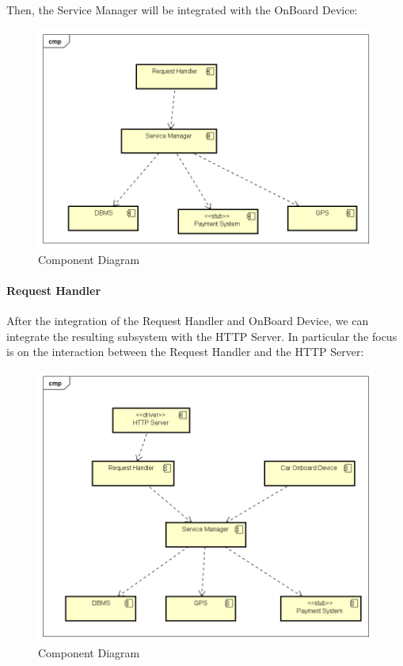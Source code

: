 Then, the Service Manager will be integrated with the OnBoard Device:


\begin{figure}[H]	
	\centering
	\includegraphics[width=\textwidth]{img/SrvMan_ReqHan_int}
	\caption{Component Diagram}
\end{figure}

\paragraph{Request Handler}
After the integration of the Request Handler and OnBoard Device, we can integrate the resulting subsystem with the HTTP Server. In particular the focus is on the interaction between the Request Handler and the HTTP Server:
\begin{figure}[H]	
	\centering
	\includegraphics[width=\textwidth]{img/ReqHan_HTTP_int}
	\caption{Component Diagram}
\end{figure}


